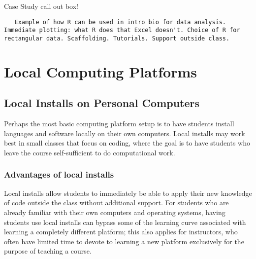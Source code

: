 {\begin{framed}
Case Study call out box! 
\begin{snugshade*}
\begin{lstlisting}
   Example of how R can be used in intro bio for data analysis. Immediate plotting: what R does that Excel doesn't. Choice of R for rectangular data. Scaffolding. Tutorials. Support outside class.
\end{lstlisting}
\end{snugshade*}
\end{framed}}

\section{Local Computing Platforms}

\subsection{Local Installs on Personal Computers}\label{subsect:Local Installs}

Perhaps the most basic computing platform setup is to have students install languages and software locally on their own computers. 
Local installs may work best in small classes that focus on 
coding, where the goal is to have 
students who leave the course self-sufficient to do computational work.

\subsubsection{Advantages of local installs}

Local installs allow students to immediately be able to apply their new knowledge of code outside the class without additional support. For students who are already familiar with their own computers and operating systems, having students use local installs can bypass some of the learning curve associated with learning a completely different platform; this also applies for instructors, who often have limited time to devote to learning a new platform exclusively for the purpose of teaching a course.

